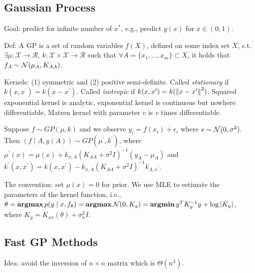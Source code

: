 \subsection{Gaussian Process}

Goal: predict for infinite number of $x^*$, e.g., predict $y(x)$ for $x\in(0,1)$.

Def: A GP is a  set of random variables $f(X)$, defined on some index set $X$, s.t.  $\exists \mu: \mathcal{X}\rightarrow \mathcal{R}$, $k:\mathcal{X}\times \mathcal{X}\rightarrow\mathcal{R}$ such that $\forall A=\{x_1,\dots,x_m\}\subset X$, it holds that $f_A\sim\mathcal{N}(\mu_A, K_{AA})$.

Kernels: (1) symmetric and (2) positive semi-definite. Called \emph{stationary} if $k(x,x^\prime)=k(x-x^\prime)$. Called \emph{isotropic} if $k(x,x^\prime)=k(\left\lVert x-x^\prime\right\rVert^2)$. Squared exponential kernel is analytic, exponential kernel is continuous but nowhere differentiable, Matren kernel with parameter $v$ is $v$ times differentiable.

Suppose $f\sim GP(\mu, k)$ and we observe $y_i=f(x_i)+\epsilon_i$ where $\epsilon\sim\mathcal{N}(0,\sigma^2)$. Then $(f\mid A,y(A))\sim GP(\mu^\prime, k^\prime)$, where $\mu^\prime(x) = \mu(x)+k_{x,A}(K_{AA}+\sigma^2I)^{-1}(y_A-\mu_A)$ and $k^\prime(x,x^\prime)=k(x,x^\prime)-k_{x,A}(K_{AA}+\sigma^2I)^{-1}k_{A,x^\prime}$.

The convention: set $\mu(x)=0$ for prior. We use MLE to estimate the parameters of the kernel function, i.e., $\theta = \operatorname{\textbf{argmax}} p(y\mid x, f_\theta) = \operatorname{\textbf{argmax}} \mathcal{N}(0, K_y) = \operatorname{\textbf{argmin}} y^T K_y^{-1}y+\log|K_y|$, where $K_y=K_{xx}(\theta)+\sigma_n^2I$.

\subsection{Fast GP Methods}

Idea: avoid the inversion of $n\times n$ matrix which is $\Theta(n^3)$.


